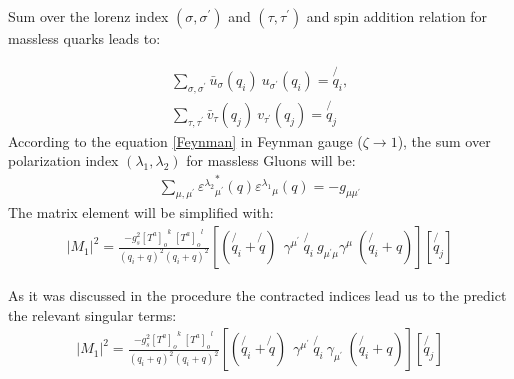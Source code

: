 Sum over the lorenz index $({\sigma},{\sigma}^{\prime})$ and $({\tau},{\tau}^{\prime})$ and spin addition relation for massless quarks leads to:
 
\begin{equation}
\begin{split}
\displaystyle\sum\limits_{{\sigma},{\sigma}^{\prime}} {\bar{u}}_{\sigma}(q_i)\:u_{{\sigma}^{\prime}}(q_i) = \not{q_i},\\
\displaystyle\sum\limits_{{\tau},{\tau}^{\prime}} {\bar{v}}_{\tau}(q_j)\:v_{{\tau}^{\prime}}(q_j) = \not{q_j} 
\end{split}
\end{equation}
According to the equation \ref{Feynman} in Feynman gauge ($ \zeta \rightarrow 1 $), the sum over polarization index $({\lambda_{1}},{\lambda}_{2})$ for massless Gluons will be:
\begin{equation}
\begin{split}
 \displaystyle\sum\limits_{{\mu},{\mu}^{\prime}} {{\varepsilon^{\lambda_2}}_{{\mu}^{\prime}}^* (q) {\varepsilon^{\lambda_1}}_{\mu} (q)} = -g_{{\mu}{\mu}^{\prime}} 
\end{split}
\end{equation}
The matrix element will be simplified with: 
\begin{equation}
\begin{split}
|M_1|^2=\frac{-g_s^2  {[T^a]_{o}}^k \: {[T^a]_o}^l }{(q_i + q)^2 (q_i + q)^2}
[(\not{q_i} + \not{q}) \:
 \:  \gamma^{{\mu}^{\prime}} \: \not{q_i} \: g_{{{\mu}^{\prime}}{\mu}} 
\gamma^{\mu} \: (\not{q_i} + q)]
[\not{q_j}]
\end{split}
\end{equation}

As it was discussed in the procedure the contracted indices lead us to the predict the relevant singular terms:
\begin{equation}
\begin{split}
|M_1|^2=\frac{-g_s^2  {[T^a]_{o}}^k \: {[T^a]_o}^l }{(q_i + q)^2 (q_i + q)^2}
[(\not{q_i} + \not{q}) \:
 \:  \gamma^{{\mu}^{\prime}} \: \not{q_i} \: 
\gamma_{{\mu}^{\prime}} \: (\not{q_i} + q)]
[\not{q_j}]
\label{first}
\end{split}
\end{equation}

